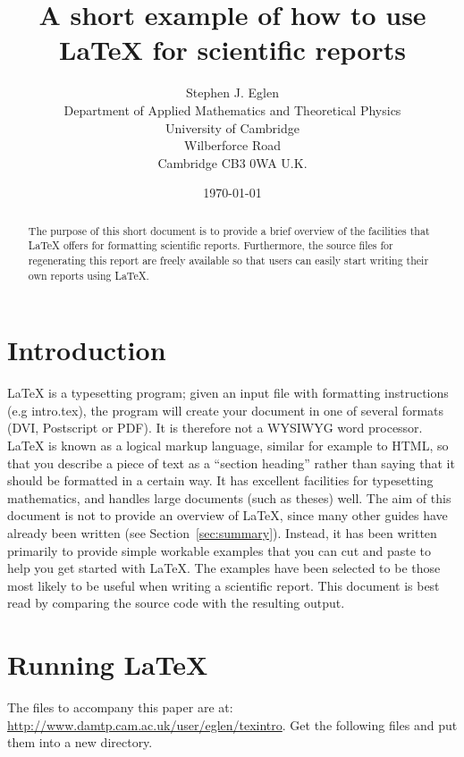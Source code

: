 \documentclass{article}
\providecommand*{\latex}{\LaTeX\xspace}
\begin{document}
\author{Stephen J. Eglen\\
  Department of Applied Mathematics and Theoretical Physics\\
  University of Cambridge\\
  Wilberforce Road\\
  Cambridge CB3 0WA  U.K.}
\date{\today}
\title{A short example of how to use \latex for scientific reports}
\maketitle

\begin{abstract}
  The purpose of this short document is to provide a brief overview of
  the facilities that \latex offers for formatting scientific reports.
  Furthermore, the source files for regenerating this report are
  freely available so that users can easily start writing their own
  reports using \latex.
\end{abstract}

\section{Introduction}

\latex is a typesetting program; given an input file with formatting
instructions (e.g intro.tex), the program will create your document in
one of several formats (DVI, Postscript or PDF).  It is therefore not
a WYSIWYG word processor.  \latex is known as a logical markup
language, similar for example to HTML, so that you describe a piece of
text as a ``section heading'' rather than saying that it should be
formatted in a certain way.  It has excellent facilities for
typesetting mathematics, and handles large documents (such as theses)
well.  The aim of this document is not to provide an overview of
\latex, since many other guides have already been written (see
Section~\ref{sec:summary}).  Instead, it has been written primarily to
provide simple workable examples that you can cut and paste to help
you get started with \latex.  The examples have been selected to be
those most likely to be useful when writing a scientific report.  This
document is best read by comparing the source code with the resulting
output.

\section{Running \latex}

The files to accompany this paper are at:
\url{http://www.damtp.cam.ac.uk/user/eglen/texintro}.  Get the
following files and put them into a new directory.
\end{document}
